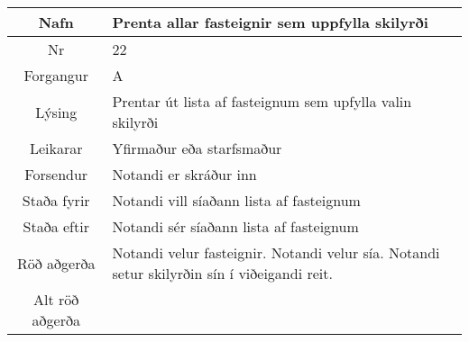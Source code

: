 \documentclass[a4paper]{article}
\begin{document}
\begin{tabular}{|c|p{10cm}|}
\hline
Nafn&Prenta allar fasteignir sem uppfylla skilyrði\\
\hline
Nr&22\\
\hline
Forgangur&A\\
\hline
Lýsing&Prentar út lista af fasteignum sem upfylla valin skilyrði\\
\hline
Leikarar&Yfirmaður eða starfsmaður\\
\hline
Forsendur&Notandi er skráður inn\\
\hline
Staða fyrir&Notandi vill síaðann lista af fasteignum\\
\hline
Staða eftir&Notandi sér síaðann lista af fasteignum\\
\hline
Röð aðgerða&Notandi velur fasteignir. Notandi velur sía. Notandi setur skilyrðin sín í viðeigandi reit. \\
\hline
Alt röð aðgerða&\\
\hline
\end{tabular}
\end{document}
